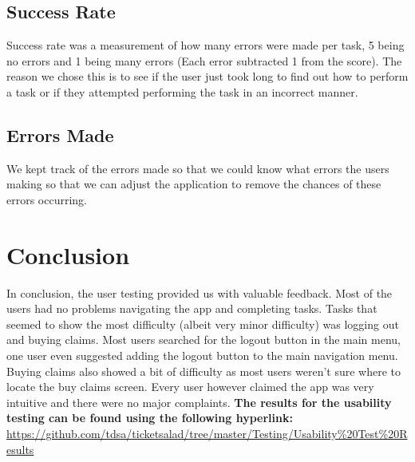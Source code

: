 \documentclass[11pt]{article}
\begin{document}
	\subsection{Success Rate}
	Success rate was a measurement of how many errors were made per task, 5 being no errors and 1 being many errors (Each error subtracted 1 from the score). The reason we chose this is to see if the user just took long to find out how to perform a task or if they attempted performing the task in an incorrect manner.
	\subsection{Errors Made}
	We kept track of the errors made so that we could know what errors the users making so that we can adjust the application to remove the chances of these errors occurring.
	\section{Conclusion}
	In conclusion, the user testing provided us with valuable feedback. Most of the users had no problems navigating the app and completing tasks. Tasks that seemed to show the most difficulty (albeit very minor difficulty) was logging out and buying claims. Most users searched for the logout button in the main menu, one user even suggested adding the logout button to the main navigation menu. Buying claims also showed a bit of difficulty as most users weren’t sure where to locate the buy claims screen. Every user however claimed the app was very intuitive and there were no major complaints.	
	\newline
	\newline
	\textbf{The results for the usability testing can be found using the following hyperlink: } 
	\newline
	\href{https://github.com/tdsa/ticketsalad/tree/master/Testing/Usability\%20Test\%20Results}{https://github.com/tdsa/ticketsalad/tree/master/Testing/Usability\%20Test\%20Results} 
\end{document}
